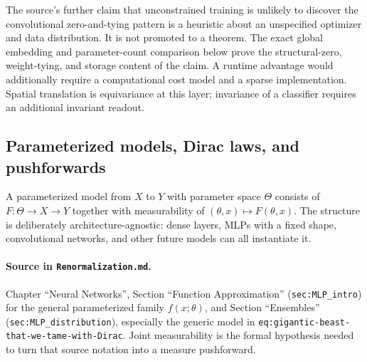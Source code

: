 The source's further claim that unconstrained training is unlikely to discover the convolutional
zero-and-tying pattern is a heuristic about an unspecified optimizer and data distribution.  It is
not promoted to a theorem.  The exact global embedding and parameter-count comparison below prove
the structural-zero, weight-tying, and storage content of the claim.  A runtime advantage would
additionally require a computational cost model and a sparse implementation.  Spatial
translation is equivariance at this layer; invariance of a classifier requires an additional
invariant readout.

\subsection{Parameterized models, Dirac laws, and pushforwards}

\begin{definition}
\label{def:renorm:paramModel}
A parameterized model from $X$ to $Y$ with parameter space $\Theta$ consists of
$F:\Theta\to X\to Y$ together with measurability of
$(\theta,x)\mapsto F(\theta,x)$.  The structure is deliberately architecture-agnostic: dense
layers, MLPs with a fixed shape, convolutional networks, and other future models can all instantiate
it.

\paragraph{Source in \texttt{Renormalization.md}.}
Chapter ``Neural Networks'', Section ``Function Approximation'' (\texttt{sec:MLP\_intro}) for the
general parameterized family $f(x;\theta)$, and Section ``Ensembles''
(\texttt{sec:MLP\_distribution}), especially the generic model in
\texttt{eq:gigantic-beast-that-we-tame-with-Dirac}.  Joint measurability is the formal hypothesis
needed to turn that source notation into a measure pushforward.
\end{definition}

